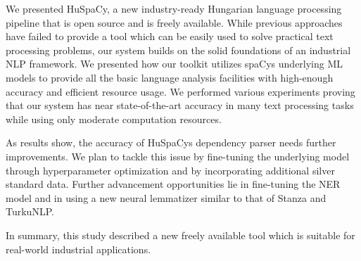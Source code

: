 \documentclass{llncs}
\newcommand{\huspacy}{HuSpaCy}
\begin{document}
We presented \huspacy{}, a new industry-ready Hungarian language processing pipeline that is open source and is freely available. While previous approaches have failed to provide a tool which can be easily used to solve practical text processing problems, our system builds on the solid foundations of an industrial NLP framework. We presented how our toolkit utilizes spaCy\textquotesingle s underlying ML models to provide all the basic language analysis facilities with high-enough accuracy and efficient resource usage. We performed various experiments proving that our system has near state-of-the-art accuracy in many text processing tasks while using only moderate computation resources.

As results show, the accuracy of \huspacy\textquotesingle s dependency parser needs further improvements. We plan to tackle this issue by fine-tuning the underlying model through hyperparameter optimization and by incorporating additional silver standard data. Further advancement opportunities lie in fine-tuning the NER model and in using a new neural lemmatizer similar to that of Stanza and TurkuNLP. 

In summary, this study described a new freely available tool which is suitable for real-world industrial applications.
\end{document}
